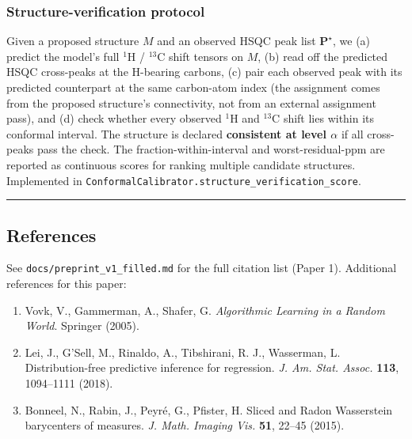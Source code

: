 \subsubsection{Structure-verification protocol}\label{structure-verification-protocol}

Given a proposed structure \(M\) and an observed HSQC peak list \(\mathbf{P}^\star\), we (a) predict the model's full \(^{1}\)H / \(^{13}\)C shift tensors on \(M\), (b) read off the predicted HSQC cross-peaks at the H-bearing carbons, (c) pair each observed peak with its predicted counterpart at the same carbon-atom index (the assignment comes from the proposed structure's connectivity, not from an external assignment pass), and (d) check whether every observed \(^{1}\)H and \(^{13}\)C shift lies within its conformal interval. The structure is declared \textbf{consistent at level \(\alpha\)} if all cross-peaks pass the check. The fraction-within-interval and worst-residual-ppm are reported as continuous scores for ranking multiple candidate structures. Implemented in \texttt{ConformalCalibrator.structure\_verification\_score}.

\begin{center}\rule{0.5\linewidth}{0.5pt}\end{center}

\subsection{References}\label{references}

See \texttt{docs/preprint\_v1\_filled.md} for the full citation list (Paper 1). Additional references for this paper:

\begin{enumerate}
\def\labelenumi{\arabic{enumi}.}
\tightlist
\item
  Vovk, V., Gammerman, A., Shafer, G. \emph{Algorithmic Learning in a Random World}. Springer (2005).
\item
  Lei, J., G'Sell, M., Rinaldo, A., Tibshirani, R. J., Wasserman, L. Distribution-free predictive inference for regression. \emph{J. Am. Stat. Assoc.} \textbf{113}, 1094--1111 (2018).
\item
  Bonneel, N., Rabin, J., Peyré, G., Pfister, H. Sliced and Radon Wasserstein barycenters of measures. \emph{J. Math. Imaging Vis.} \textbf{51}, 22--45 (2015).
\end{enumerate}
